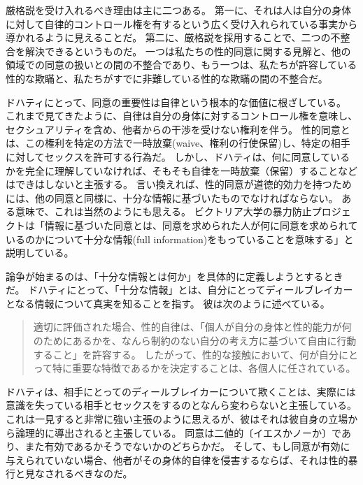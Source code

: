 \documentclass[paper=a4,book,openany]{jlreq}
\begin{document}
厳格説を受け入れるべき理由は主に二つある。
第一に、それは人は自分の身体に対して自律的コントロール権を有するという広く受け入れられている事実から導かれるように見えることだ。
第二に、厳格説を採用することで、二つの不整合を解決できるというものだ。
一つは私たちの性的同意に関する見解と、他の領域での同意の扱いとの間の不整合であり、もう一つは、私たちが許容している性的な欺瞞と、私たちがすでに非難している性的な欺瞞の間の不整合だ。

ドハティにとって、同意の重要性は自律という根本的な価値に根ざしている。
これまで見てきたように、自律は自分の身体に対するコントロール権を意味し、セクシュアリティを含め、他者からの干渉を受けない権利を伴う。
性的同意とは、この権利を特定の方法で一時放棄(waive、権利の行使保留)し、特定の相手に対してセックスを許可する行為だ。
しかし、ドハティは、何に同意しているかを完全に理解していなければ、そもそも自律を一時放棄（保留）することなどはできはしないと主張する。
言い換えれば、性的同意が道徳的効力を持つためには、他の同意と同様に、十分な情報に基づいたものでなければならない。
ある意味で、これは当然のようにも思える。
ビクトリア大学の暴力防止プロジェクトは「情報に基づいた同意とは、同意を求められた人が何に同意を求められているのかについて十分な情報(full information)をもっていることを意味する」と説明している\citep{project25:_consen}。

論争が始まるのは、「十分な情報とは何か」を具体的に定義しようとするときだ。
ドハティにとって、「十分な情報」とは、自分にとってディールブレイカーとなる情報について真実を知ることを指す。
彼は次のように述べている。

\begin{quote}
適切に評価された場合、性的自律は、「個人が自分の身体と性的能力が何のためにあるかを、なんら制約のない自分の考え方に基づいて自由に行動すること」\citep[p.70]{schulhofer92:_takin_sexual_auton_serious}を許容する。
したがって、性的な接触において、何が自分にとって特に重要な特徴であるかを決定することは、各個人に任されている。
\citep[p.730]{dougherty13:_sex_lies_consen}

\end{quote}

ドハティは、相手にとってのディールブレイカーについて欺くことは、実際には意識を失っている相手とセックスをするのとなんら変わらないと主張している。
これは一見すると非常に強い主張のように思えるが、彼はそれは彼自身の立場から論理的に導出されると主張している。
同意は二値的〔イエスかノーか〕であり、また有効であるかそうでないかのどちらかだ。
そして、もし同意が有効に与えられていない場合、他者がその身体的自律を侵害するならば、それは性的暴行と見なされるべきなのだ。
\end{document}

